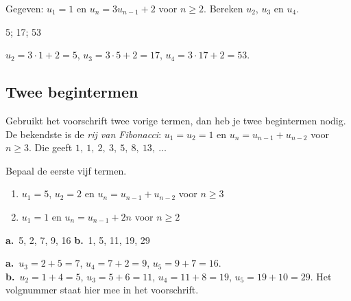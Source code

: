 
\begin{oefeningen}
\begin{oefening}
Gegeven: $u_1 = 1$ en $u_n = 3u_{n-1} + 2$ voor $n \geqslant 2$. Bereken $u_2$, $u_3$ en $u_4$.
\begin{solution}
5; 17; 53
\end{solution}
\begin{fullsolution}
$u_2=3\cdot 1+2=5$, $u_3=3\cdot 5+2=17$, $u_4=3\cdot 17+2=53$.
\end{fullsolution}
\end{oefening}
\end{oefeningen}

\subsection{Twee begintermen}

Gebruikt het voorschrift twee vorige termen, dan heb je twee begintermen nodig. De bekendste is de \emph{rij van Fibonacci}: $u_1 = u_2 = 1$ en $u_n = u_{n-1} + u_{n-2}$ voor $n \geqslant 3$. Die geeft $1,\ 1,\ 2,\ 3,\ 5,\ 8,\ 13,\ \ldots$


\begin{oefeningen}
\begin{oefening}
Bepaal de eerste vijf termen.
\begin{enumerate}
  \item $u_1 = 5$, $u_2 = 2$ en $u_n = u_{n-1} + u_{n-2}$ voor $n \geqslant 3$
  \item $u_1 = 1$ en $u_n = u_{n-1} + 2n$ voor $n \geqslant 2$
\end{enumerate}
\begin{solution}
\textbf{a.}~5, 2, 7, 9, 16 \quad \textbf{b.}~1, 5, 11, 19, 29
\end{solution}
\begin{fullsolution}
\textbf{a.}~$u_3=2+5=7$, $u_4=7+2=9$, $u_5=9+7=16$.\\
\textbf{b.}~$u_2=1+4=5$, $u_3=5+6=11$, $u_4=11+8=19$, $u_5=19+10=29$. Het volgnummer staat hier mee in het voorschrift.
\end{fullsolution}
\end{oefening}
\end{oefeningen}

